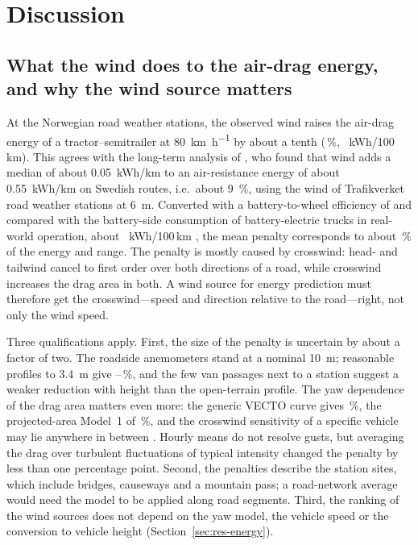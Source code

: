 \section{Discussion}
\label{sec:discussion}

\subsection{What the wind does to the air-drag energy, and why the wind source matters}
At the Norwegian road weather stations, the observed wind raises the air-drag energy of a tractor--semitrailer at \SI{80}{km.h^{-1}} by about a tenth (\enAddNo\,\%, \enAddKwhNo~kWh/100\,km). This agrees with the long-term analysis of \citet{Filla2026}, who found that wind adds a median of about 0.05~kWh/km to an air-resistance energy of about 0.55~kWh/km on Swedish routes, i.e.\ about \SI{9}{\percent}, using the wind of Trafikverket road weather stations at \SI{6}{m}. Converted with a battery-to-wheel efficiency of \enEta{} and compared with the battery-side consumption of battery-electric trucks in real-world operation, about \enBetTotal~kWh/100\,km \citep{LeCorguille2025}, the mean penalty corresponds to about \enAddShareTotalNo\,\% of the energy and range. The penalty is mostly caused by crosswind: head- and tailwind cancel to first order over both directions of a road, while crosswind increases the drag area in both. A wind source for energy prediction must therefore get the crosswind---speed and direction relative to the road---right, not only the wind speed.

Three qualifications apply. First, the size of the penalty is uncertain by about a factor of two. The roadside anemometers stand at a nominal \SI{10}{m}; reasonable profiles to \SI{3.4}{m} give \enBandNoLo--\enBandNoHi\,\%, and the few van passages next to a station suggest a weaker reduction with height than the open-terrain profile. The yaw dependence of the drag area matters even more: the generic VECTO curve gives \enAddNo\,\%, the projected-area Model~1 of \citet{Askerdal2024crosswind} \enAddNoMOne\,\%, and the crosswind sensitivity of a specific vehicle may lie anywhere in between \citep{ArayaReyes2026}. Hourly means do not resolve gusts, but averaging the drag over turbulent fluctuations of typical intensity changed the penalty by less than one percentage point. Second, the penalties describe the station sites, which include bridges, causeways and a mountain pass; a road-network average would need the model to be applied along road segments. Third, the ranking of the wind sources does not depend on the yaw model, the vehicle speed or the conversion to vehicle height (Section~\ref{sec:res-energy}).

